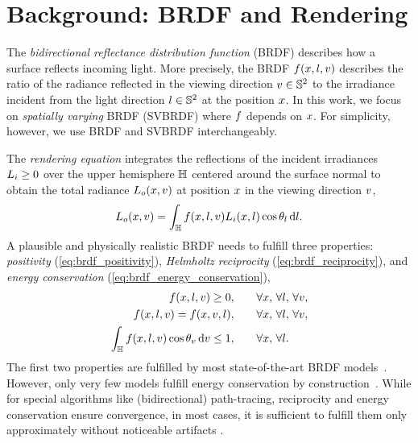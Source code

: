\section{Background: BRDF and Rendering}
\label{sec:background}

The \emph{bidirectional reflectance distribution function} (BRDF) describes how a surface reflects incoming light. More precisely, the BRDF $f(x, l, v)$ describes the ratio of the radiance reflected in the viewing direction $v\in\mathbb{S}^2$ to the irradiance incident from the light direction $l\in\mathbb{S}^2$ at the position $x$. 
In this work, we focus on \emph{spatially varying} BRDF (SVBRDF) where $f$ depends on $x$. For simplicity, however, we use BRDF and SVBRDF interchangeably.

The \emph{rendering equation} 
integrates the reflections of the incident irradiances $L_i\geq 0$ over the upper hemisphere $\mathbb{H}$ centered around the surface normal to obtain the total radiance $L_o(x, v)$ at position $x$ in the viewing direction $v$,
\begin{equation}\label{eq:rendering_eq}
    L_o(x, v) = \int_{\mathbb{H}} f(x, l, v) L_i(x, l) \cos\theta_l \,\mathrm{d}l.
\end{equation}
A plausible and physically realistic BRDF needs to fulfill three properties:
\emph{positivity} (\cref{eq:brdf_positivity}), \emph{Helmholtz reciprocity} (\cref{eq:brdf_reciprocity}), and \emph{energy conservation} (\cref{eq:brdf_energy_conservation}),
\begin{align}
    f(x, l, v)\geq 0,\qquad &\forall x,\, \forall l,\, \forall v, \label{eq:brdf_positivity} \\
    f(x, l, v) = f(x, v, l),\qquad &\forall x,\, \forall l,\, \forall v, \label{eq:brdf_reciprocity} \\
    \int_{\mathbb{H}} f(x, l, v)\cos{\theta_{v}} \,\mathrm{d}v \le 1,\qquad &\forall x,\, \forall l. \label{eq:brdf_energy_conservation}
\end{align}
The first two properties are fulfilled by most state-of-the-art BRDF models~\cite{lafortune1994using,torrance1967theory,burley2012physically}. However, only very few models fulfill energy conservation by construction~\cite{lafortune1994using}. While for special algorithms like (bidirectional) path-tracing, reciprocity and energy conservation ensure convergence, in most cases, it is sufficient to fulfill them only approximately without noticeable artifacts \cite{akenine2019realTimeRendering}.


